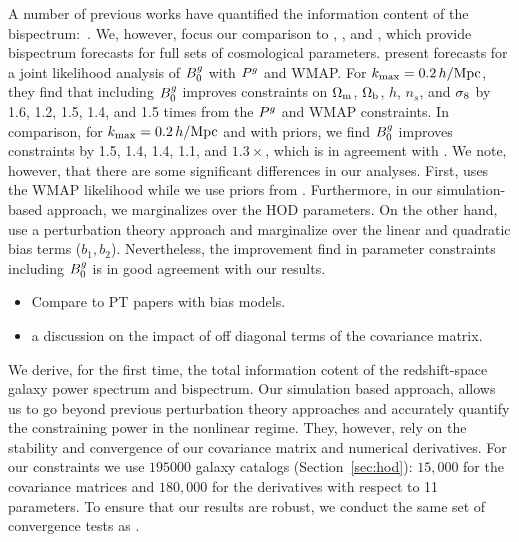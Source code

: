 A number of previous works have quantified the information content of the
bispectrum:~\citep[\eg][]{scoccimarro2004, sefusatti2006, sefusatti2007,
song2015, tellarini2016, yamauchi2017a, karagiannis2018, yankelevich2019,
chudaykin2019, coulton2019, reischke2019}. 
We, however, focus our comparison to \cite{sefusatti2006}, \cite{yankelevich2019}, 
and \cite{chudaykin2019}, which provide bispectrum forecasts for full sets of
cosmological parameters.
\cite{sefusatti2006} present \lcdm forecasts for a joint likelihood analysis of
$B^g_0$ with $P^g$ and WMAP. For $k_{\rm max} = 0.2\,h/\mathrm{Mpc}$, they find that including
$B^g_0$ improves constraints on $\Omega_{\rm m}$, $\Omega_{\rm b}$, $h$, $n_s$, and $\sigma_8$ by 1.6, 1.2,
1.5, 1.4, and 1.5 times from the $P^g$ and WMAP constraints. In comparison, for 
$k_{\rm max} = 0.2\,h/\mathrm{Mpc}$ and with \planck priors, we find $B^g_0$ improves constraints
by  1.5, 1.4, 1.4, 1.1, and $1.3\times$, which is in agreement with
\cite{sefusatti2006}. We note, however, that there are
some significant differences in our analyses. First, \cite{sefusatti2006} uses 
the WMAP likelihood while we use priors from \planck. Furthermore, 
in our simulation-based approach, we marginalizes over the HOD parameters. On
the other hand, \cite{sefusatti2006} use a perturbation theory approach and 
marginalize over the linear and quadratic bias terms ($b_1, b_2$). 
Nevertheless, the improvement \cite{sefusatti2006} find in parameter constraints 
including $B^g_0$ is in good agreement with our results. 

\begin{itemize}
    \item Compare to PT papers with bias models. 
    \item a discussion on the impact of off diagonal terms of the covariance matrix. 
\end{itemize} 

We derive, for the first time, the total information cotent of the redshift-space 
galaxy power spectrum and bispectrum. Our simulation based approach, allows us
to go beyond previous perturbation theory approaches and accurately quantify the 
constraining power in the nonlinear regime. They, however, rely on the
stability and convergence of our covariance matrix and numerical derivatives.  
For our constraints we use $195000$ galaxy catalogs (Section~\ref{sec:hod}): 
$15,000$ for the covariance matrices and $180,000$ for the derivatives with 
respect to 11 parameters. To ensure that our results are robust, we conduct the
same set of convergence tests as \cite{hahn2020}. 

